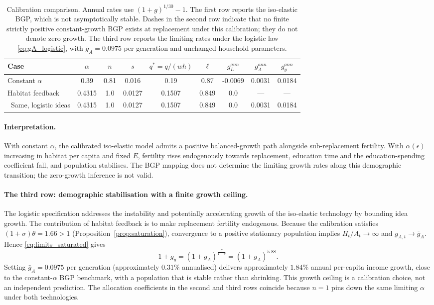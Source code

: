 \documentclass[11pt]{article}
\begin{document}
\begin{table}[h!]\centering
\begin{tabular}{lcccccccc}
\hline
Case & $\alpha$ & $n$ & $s$ & $q^{\ast}\!=\!q/(wh)$ & $\ell$ &
$g_L^{ann}$ & $g_A^{ann}$ & $g_y^{ann}$\\
\hline
Constant $\alpha$ &
0.39 & 0.81 & 0.016 & 0.19 & 0.87 &
-0.0069 & 0.0031& 0.0184 \\
Habitat feedback &
0.4315 & 1.0 & 0.0127 & 0.1507 & 0.849 &
0.0 & --- & --- \\
\ Same, logistic ideas &
0.4315 & 1.0 & 0.0127 & 0.1507 & 0.849 &
0.0 & 0.0031 & 0.0184 \\
\hline
\end{tabular}

\caption{Calibration comparison. Annual rates use $(1+g)^{1/30}-1$. The first row reports the
iso-elastic BGP, which is not asymptotically stable. Dashes in the second row indicate that no
finite strictly positive constant-growth BGP exists at replacement under this calibration;
they do not denote zero growth. The third row reports the limiting rates under the logistic law
\eqref{eq:gA_logistic}, with $\bar g_A=0.0975$ per generation and unchanged household parameters.}
\end{table}

\paragraph{Interpretation.}
With constant $\alpha$, the calibrated iso-elastic model admits a positive balanced-growth path
alongside sub-replacement fertility. With $\alpha(\epsilon)$ increasing in habitat per capita
and fixed $E$, fertility rises endogenously towards replacement, education time and the
education-spending coefficient fall, and population stabilises. The BGP mapping does not determine
the limiting growth rates along this demographic transition; the zero-growth inference is not valid.

\paragraph{The third row: demographic stabilisation with a finite growth ceiling.}
The logistic specification addresses the instability and potentially accelerating growth of the
iso-elastic technology by bounding idea growth. The contribution of habitat feedback is to make
replacement fertility endogenous. Because the calibration satisfies
$(1+\sigma)\theta=1.66>1$ (Proposition~\ref{prop:saturation}), convergence to a positive stationary
population implies $H_t/A_t\to\infty$ and $g_{A,t}\to\bar g_A$. Hence
\eqref{eq:limits_saturated} gives
\[
1+g_y=(1+\bar g_A)^{\frac{\sigma}{1-\theta}}=(1+\bar g_A)^{5.88}.
\]
Setting $\bar g_A=0.0975$ per generation (approximately $0.31\%$ annualised) delivers
approximately $1.84\%$ annual per-capita income growth, close to the constant-$\alpha$ BGP
benchmark, with a population that is stable rather than shrinking. This growth ceiling is a
calibration choice, not an independent prediction. The allocation coefficients in the second and
third rows coincide because $n=1$ pins down the same limiting $\alpha$ under both technologies.
\end{document}
